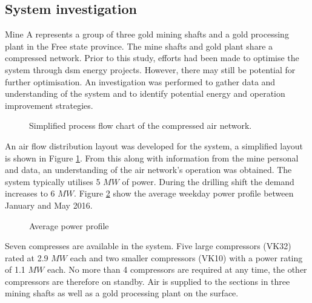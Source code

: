 \subsection{System investigation}
Mine A represents a group of three gold mining shafts and a gold processing plant in the Free state province. The mine shafts and gold plant share a compressed network. Prior to this study, efforts had been made to optimise the system through \gls{dsm} energy projects. However, there may still be potential for further optimisation. An investigation was performed to gather data and understanding of the system and to identify potential energy and operation improvement strategies.
\par 
\begin{figure}[h!]
	\centering
	\caption{Simplified process flow chart of the compressed air network.}
	\label{fig: Beatrix Air layout}
\end{figure}
An air flow distribution layout was developed for the system, a simplified layout is shown in Figure \ref{fig: Beatrix Air layout}. From this along with information from the mine personal and data, an understanding of the air network's operation was obtained. The system typically utilises 5 $MW$ of power. During the drilling shift the demand increases to 6 $MW$. Figure \ref{fig: Beatrix power baseline} show the average weekday power profile between January and May 2016.
\begin{figure}[h!]
	\centering
	
	\caption{Average power profile}
	\label{fig: Beatrix power baseline}
\end{figure}
\par 
 Seven compresses are available in the system. Five large compressors (VK32) rated at 2.9 $MW$ each and two smaller compressors (VK10) with a power rating of 1.1 $MW$ each. No more than 4 compressors are required at any time, the other compressors are therefore on standby. Air is supplied to the sections in three mining shafts as well as a gold processing plant on the surface. 
